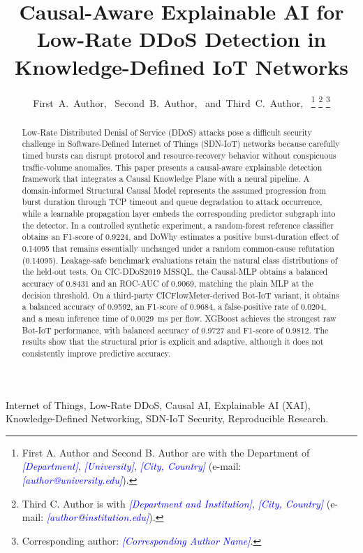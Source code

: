 \documentclass[journal]{IEEEtran}
\newcommand{\placeholder}[1]{\textcolor{blue}{\textit{[#1]}}}
\begin{document}
\title{Causal-Aware Explainable AI for Low-Rate DDoS Detection in Knowledge-Defined IoT Networks}

\author{First~A.~Author,~
  Second~B.~Author,~
  and~Third~C.~Author,~%
  \thanks{First A. Author and Second B. Author are with the Department of
    \placeholder{Department}, \placeholder{University}, \placeholder{City, Country}
  (e-mail: \placeholder{author@university.edu}).}%
  \thanks{Third C. Author is with \placeholder{Department and Institution},
  \placeholder{City, Country} (e-mail: \placeholder{author@institution.edu}).}%
\thanks{Corresponding author: \placeholder{Corresponding Author Name}.}}


\maketitle

\begin{abstract}
  Low-Rate Distributed Denial of Service (DDoS) attacks pose a difficult security challenge in Software-Defined Internet of Things (SDN-IoT) networks because carefully timed bursts can disrupt protocol and resource-recovery behavior without conspicuous traffic-volume anomalies. This paper presents a causal-aware explainable detection framework that integrates a Causal Knowledge Plane with a neural pipeline. A domain-informed Structural Causal Model represents the assumed progression from burst duration through TCP timeout and queue degradation to attack occurrence, while a learnable propagation layer embeds the corresponding predictor subgraph into the detector. In a controlled synthetic experiment, a random-forest reference classifier obtains an F1-score of 0.9224, and DoWhy estimates a positive burst-duration effect of 0.14095 that remains essentially unchanged under a random common-cause refutation (0.14095). Leakage-safe benchmark evaluations retain the natural class distributions of the held-out tests. On CIC-DDoS2019 MSSQL, the Causal-MLP obtains a balanced accuracy of 0.8431 and an ROC-AUC of 0.9069, matching the plain MLP at the decision threshold. On a third-party CICFlowMeter-derived Bot-IoT variant, it obtains a balanced accuracy of 0.9592, an F1-score of 0.9684, a false-positive rate of 0.0204, and a mean inference time of 0.0029~ms per flow. XGBoost achieves the strongest raw Bot-IoT performance, with balanced accuracy of 0.9727 and F1-score of 0.9812. The results show that the structural prior is explicit and adaptive, although it does not consistently improve predictive accuracy.
\end{abstract}
\begin{IEEEkeywords}
  Internet of Things, Low-Rate DDoS, Causal AI, Explainable AI (XAI), Knowledge-Defined Networking, SDN-IoT Security, Reproducible Research.
\end{IEEEkeywords}
\end{document}
